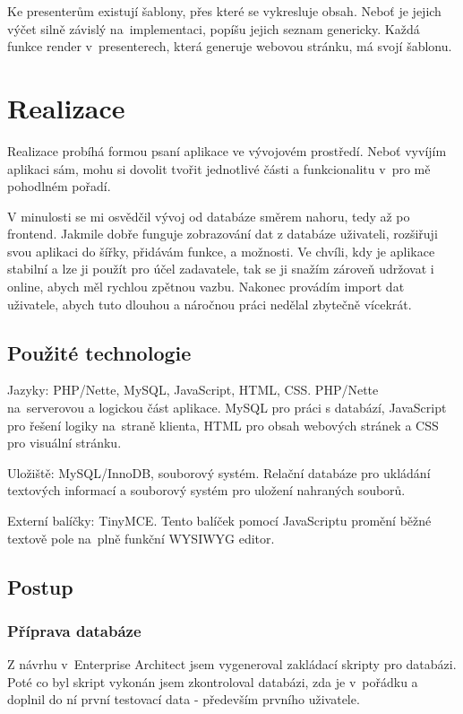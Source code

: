 \documentclass[thesis=B,czech]{FITthesis}[2012/06/26]
\begin{document}
Ke presenterům existují šablony, přes které se vykresluje obsah. Neboť je jejich výčet silně závislý na~implementaci, popíšu jejich seznam genericky. Každá funkce render v~presenterech, která generuje webovou stránku, má svojí šablonu.

\chapter{Realizace}

Realizace probíhá formou psaní aplikace ve vývojovém prostředí. Neboť vyvíjím aplikaci sám, mohu si dovolit tvořit jednotlivé části a funkcionalitu v~pro mě pohodlném pořadí.

V minulosti se mi osvědčil vývoj od databáze směrem nahoru, tedy až po frontend. Jakmile dobře funguje zobrazování dat z databáze uživateli, rozšiřuji svou aplikaci do šířky, přidávám funkce, a možnosti. Ve chvíli, kdy je aplikace stabilní a lze ji použít pro účel zadavatele, tak se ji snažím zároveň udržovat i online, abych měl rychlou zpětnou vazbu. Nakonec provádím import dat uživatele, abych tuto dlouhou a náročnou práci nedělal zbytečně vícekrát.

\section{Použité technologie}

Jazyky: PHP/Nette, MySQL, JavaScript, HTML, CSS. PHP/Nette na~serverovou a logickou část aplikace. MySQL pro práci s databází, JavaScript pro řešení logiky na~straně klienta, HTML pro obsah webových stránek a CSS pro visuální stránku.

Uložiště: MySQL/InnoDB, souborový systém. Relační databáze pro ukládání textových informací a souborový systém pro uložení nahraných souborů.

Externí balíčky: TinyMCE. Tento balíček pomocí JavaScriptu promění běžné textově pole na~plně funkční WYSIWYG editor.

\section{Postup}

\subsection{Příprava databáze}

Z návrhu v~Enterprise Architect jsem vygeneroval zakládací skripty pro databázi. Poté co byl skript vykonán jsem zkontroloval databázi, zda je v~pořádku a doplnil do ní první testovací data - především prvního uživatele.
\end{document}
